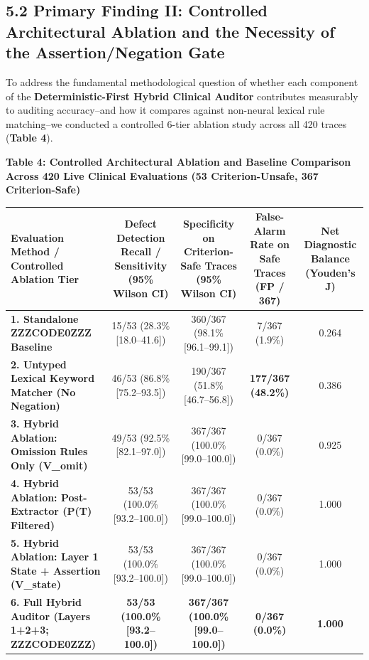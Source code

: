 \documentclass[10pt,a4paper]{article}
\begin{document}
\subsection*{5.2 Primary Finding II: Controlled Architectural Ablation and the Necessity of the Assertion/Negation Gate}

To address the fundamental methodological question of whether each component of the \textbf{Deterministic-First Hybrid Clinical Auditor} contributes measurably to auditing accuracy--and how it compares against non-neural lexical rule matching--we conducted a controlled 6-tier ablation study across all 420 traces (\textbf{Table 4}).

\textbf{Table 4: Controlled Architectural Ablation and Baseline Comparison Across 420 Live Clinical Evaluations (53 Criterion-Unsafe, 367 Criterion-Safe)}

{\scriptsize\setlength{\tabcolsep}{3.5pt}\begin{longtable}{p{}cccc}
\toprule
Evaluation Method / Controlled Ablation Tier & Defect Detection Recall / Sensitivity (95\% Wilson CI) & Specificity on Criterion-Safe Traces (95\% Wilson CI) & False-Alarm Rate on Safe Traces (FP / 367) & Net Diagnostic Balance (Youden's J) \\
\midrule
\textbf{1. Standalone ZZZCODE0ZZZ Baseline} & 15/53 (28.3\% [18.0--41.6]) & 360/367 (98.1\% [96.1--99.1]) & 7/367 (1.9\%) & 0.264 \\
\textbf{2. Untyped Lexical Keyword Matcher (No Negation)} & 46/53 (86.8\% [75.2--93.5]) & 190/367 (51.8\% [46.7--56.8]) & \textbf{177/367 (48.2\%)} & 0.386 \\
\textbf{3. Hybrid Ablation: Omission Rules Only (V\_omit)} & 49/53 (92.5\% [82.1--97.0]) & 367/367 (100.0\% [99.0--100.0]) & 0/367 (0.0\%) & 0.925 \\
\textbf{4. Hybrid Ablation: Post-Extractor (P(T) Filtered)} & 53/53 (100.0\% [93.2--100.0]) & 367/367 (100.0\% [99.0--100.0]) & 0/367 (0.0\%) & 1.000 \\
\textbf{5. Hybrid Ablation: Layer 1 State + Assertion (V\_state)} & 53/53 (100.0\% [93.2--100.0]) & 367/367 (100.0\% [99.0--100.0]) & 0/367 (0.0\%) & 1.000 \\
\textbf{6. Full Hybrid Auditor (Layers 1+2+3; ZZZCODE0ZZZ)} & \textbf{53/53 (100.0\% [93.2--100.0])} & \textbf{367/367 (100.0\% [99.0--100.0])} & \textbf{0/367 (0.0\%)} & \textbf{1.000} \\
\bottomrule
\end{longtable}}
\end{document}
